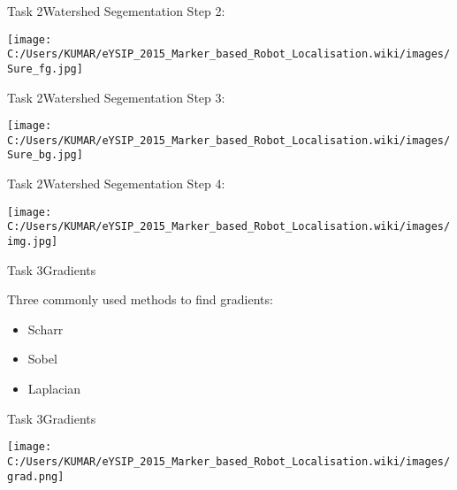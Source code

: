 \documentclass[10pt, a4paper]{beamer}
\begin{document}
\begin{frame}{Task 2}{Watershed Segementation}
	Step 2: 
	
	\begin{minipage}{0.5\textwidth}
		\centering
		\texttt{[image: C:/Users/KUMAR/eYSIP\_2015\_Marker\_based\_Robot\_Localisation.wiki/images/Sure\_fg.jpg]}
		
		
		
	\end{minipage}		
	
\end{frame}		
\begin{frame}{Task 2}{Watershed Segementation}
	Step 3: 
	
	\begin{minipage}{0.5\textwidth}
		\centering
		\texttt{[image: C:/Users/KUMAR/eYSIP\_2015\_Marker\_based\_Robot\_Localisation.wiki/images/Sure\_bg.jpg]}
		\label{fig:sfig4}
		
		
	\end{minipage}		
	
\end{frame}		
\begin{frame}{Task 2}{Watershed Segementation}
	Step 4: 
	
	\begin{minipage}{0.5\textwidth}
		\centering
		\texttt{[image: C:/Users/KUMAR/eYSIP\_2015\_Marker\_based\_Robot\_Localisation.wiki/images/img.jpg]}
		\label{fig:sfig4}
		
		
	\end{minipage}		
	
\end{frame}		

\begin{frame}{Task 3}{Gradients}
	\begin{block} {Three commonly used methods to find gradients: }\end{block}
	\begin{itemize}
		\item Scharr
		\item Sobel
		\item Laplacian
		
	\end{itemize}	
\end{frame}	
\begin{frame}{Task 3}{Gradients}

	\begin{minipage}{0.5\textwidth}
		\centering
		\texttt{[image: C:/Users/KUMAR/eYSIP\_2015\_Marker\_based\_Robot\_Localisation.wiki/images/grad.png]}

		
		
	\end{minipage}		
	
	
	
\end{frame}	
\end{document}
